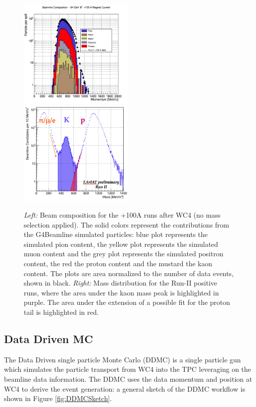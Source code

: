 \begin{figure}
\includegraphics[width=0.5\textwidth,height=\textheight,keepaspectratio]{Chapter-5/Images/Beam100Pos.png}
\includegraphics[width=0.5\textwidth,height=\textheight,keepaspectratio]{Chapter-5/Images/MassPos.png}
\caption{\emph{Left:} Beam composition for the +100A runs after WC4 (no mass selection applied). The solid colors represent the contributions from the G4Beamline simulated particles: blue plot represents the simulated pion content, the yellow plot represents the simulated muon content and the grey plot represents the simulated positron content, the red the proton content and the mustard the kaon content. The plots are area normalized to the number of data events, shown in black. \emph{Right:} Mass distribution for the Run-II positive runs, where the area under the kaon mass peak is highlighted in purple. The area under the extension of a possible fit for the proton tail is highlighted in red. }
\label{fig:BeamCompositionPos}
\end{figure}



\subsection{Data Driven MC}\label{sec:DDMC}
The Data Driven single particle Monte Carlo (DDMC) is a single particle gun which simulates the particle transport from WC4 into the TPC leveraging on the beamline data information. The DDMC uses the data momentum and position at WC4 to derive the event generation: a general sketch of the DDMC workflow is shown in Figure \ref{fig:DDMCSketch}.

